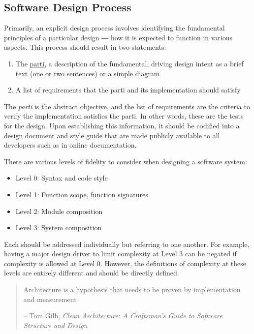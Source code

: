\documentclass[]{nrel}
\begin{document}
\subsection{Software Design Process}

Primarily, an explicit design process involves identifying the fundamental principles
of a particular design ― how it is expected to function in various aspects.
This process should result in two statements:

\begin{enumerate}
\item The \href{https://en.wikipedia.org/wiki/Parti_(architecture)}{parti}, a description of the
    fundamental, driving design intent as a brief text (one or two sentences) or a
    simple diagram
\item A list of requirements that the parti and its implementation should satisfy
\end{enumerate}

The \textit{parti} is the abstract objective, and the list of requirements are the criteria
to verify the implementation satisfies the parti.
In other words, these are the tests for the design.
Upon establishing this information, it should be codified into a design document and style
guide that are made publicly available to all developers such as in online documentation.

There are various levels of fidelity to consider when designing a software system:
\begin{itemize}
\item Level 0: Syntax and code style
\item Level 1: Function scope, function signatures
\item Level 2: Module composition
\item Level 3: System composition
\end{itemize}

Each should be addressed individually but referring to one another. For example, having a major
design driver to limit complexity at Level 3 can be negated if complexity is allowed
at Level 0. However, the definitions of complexity at these levels are entirely different and
should be directly defined.

\begin{quote}
    Architecture is a hypothesis that needs to be proven by implementation and measurement

    -- Tom Gilb, \textit{Clean Architecture: A Craftsman's Guide to Software Structure and Design}
\end{quote}
\end{document}
